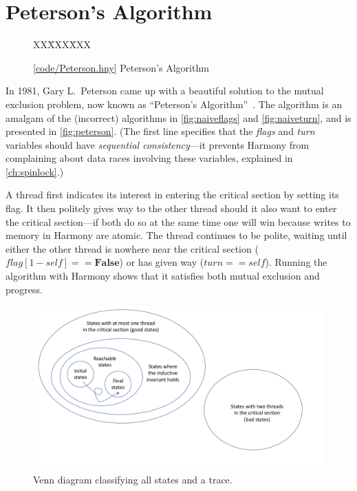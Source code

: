 \documentclass{report}
\newcommand{\harmonysource}[1]{
\begin{tabbing}
XX\=XXX\=XXX\kill
    
\end{tabbing}
}
\newcommand{\harmonylink}[1]{%
[\href{https://harmony.cs.cornell.edu/#1}{\underline{#1}}]%
}
\newenvironment{code}{
\tcolorbox
}{
\endtcolorbox
}
\begin{document}
\chapter{Peterson's Algorithm}
\label{ch:peterson}
%

\begin{figure}
\begin{code}
\harmonysource{Peterson}
\end{code}
\caption{\harmonylink{code/Peterson.hny} Peterson's Algorithm}
\label{fig:peterson}
\end{figure}

%
In 1981, Gary L.~Peterson came up with a beautiful solution to the mutual exclusion
problem, now known as ``Peterson's Algorithm''~\cite{Peterson81}.
The algorithm is an amalgam of the (incorrect) algorithms in
\autoref{fig:naiveflags} and \autoref{fig:naiveturn}, and is presented
in \autoref{fig:peterson}.
(The first line specifies that the \textit{flags} and \textit{turn}
variables should have \emph{sequential consistency}---it prevents
Harmony from complaining about data races involving these variables,
explained in \autoref{ch:spinlock}.)

A thread first indicates its interest in entering the critical section
by setting its flag.
It then politely gives way to the other thread should it also want to
enter the critical section---if both do so at the same time one will
win because writes to memory in Harmony are atomic.
The thread continues to be polite, waiting
until either the other thread is nowhere near the critical section
($\mathit{flag}[1 - \mathit{self}] == \mathbf{False}$) or has given way
($\mathit{turn} == \mathit{self}$).
Running the algorithm with Harmony shows that it satisfies both mutual
exclusion and progress.

\begin{figure}
\begin{center}
\includegraphics[width=6in]{figures/states-crop.pdf}
\end{center}
\caption{Venn diagram classifying all states and a trace.}
\label{fig:states}
\end{figure}
\end{document}
